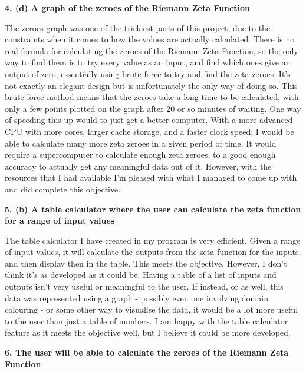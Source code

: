 \documentclass{article}
\begin{document}
\textbf{4. (d) A graph of the zeroes of the Riemann Zeta Function}

The zeroes graph was one of the trickiest parts of this project, due to the constraints when it comes to how the values are actually calculated. There is no real formula for calculating the zeroes of the Riemann Zeta Function, so the only way to find them is to try every value as an input, and find which ones give an output of zero, essentially using brute force to try and find the zeta zeroes. It's not exactly an elegant design but is unfortunately the only way of doing so. This brute force method means that the zeroes take a long time to be calculated, with only a few points plotted on the graph after 20 or so minutes of waiting. One way of speeding this up would to just get a better computer. With a more advanced CPU with more cores, larger cache storage, and a faster clock speed; I would be able to calculate many more zeta zeroes in a given period of time. It would require a supercomputer to calculate enough zeta zeroes, to a good enough accuracy to actually get any meaningful data out of it. However, with the resources that I had available I'm pleased with what I managed to come up with and did complete this objective.

\textbf{5. (b) A table calculator where the user can calculate the zeta function for a range of input values}

The table calculator I have created in my program is very efficient. Given a range of input values, it will calculate the outputs from the zeta function for the inputs, and then display then in the table. This meets the objective. However, I don't think it's as developed as it could be. Having a table of a list of inputs and outputs isn't very useful or meaningful to the user. If instead, or as well, this data was represented using a graph - possibly even one involving domain colouring - or some other way to visualise the data, it would be a lot more useful to the user than just a table of numbers. I am happy with the table calculator feature as it meets the objective well, but I believe it could be more developed.


\textbf{6. The user will be able to calculate the zeroes of the Riemann Zeta Function}
\end{document}
